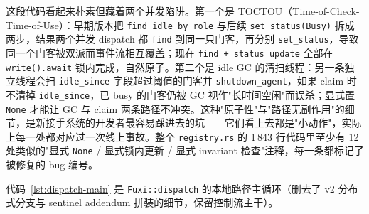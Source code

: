 这段代码看起来朴素但藏着两个并发陷阱。第一个是 TOCTOU（Time-of-Check-Time-of-Use）：早期版本把 \texttt{find\_idle\_by\_role} 与后续 \texttt{set\_status(Busy)} 拆成两步，结果两个并发 dispatch 都 \texttt{find} 到同一只门客，再分别 \texttt{set\_status}，导致同一个门客被双派而事件流相互覆盖；现在 \texttt{find + status update} 全部在 \texttt{write().await} 锁内完成，自然原子。第二个是 idle GC 的清扫线程：另一条独立线程会扫 \texttt{idle\_since} 字段超过阈值的门客并 \texttt{shutdown\_agent}，如果 claim 时不清掉 \texttt{idle\_since}，已 busy 的门客仍被 GC 视作"长时间空闲"而误杀；显式置 \texttt{None} 才能让 GC 与 claim 两条路径不冲突。这种"原子性"与"路径无副作用"的细节，是新接手系统的开发者最容易踩进去的坑——它们看上去都是"小动作"，实际上每一处都对应过一次线上事故。整个 \texttt{registry.rs} 的 1\,843 行代码里至少有 12 处类似的"显式 \texttt{None} / 显式锁内更新 / 显式 invariant 检查"注释，每一条都标记了被修复的 bug 编号。

代码~\ref{lst:dispatch-main} 是 \texttt{Fuxi::dispatch} 的本地路径主循环（删去了 v2 分布式分支与 sentinel addendum 拼装的细节，保留控制流主干）。

